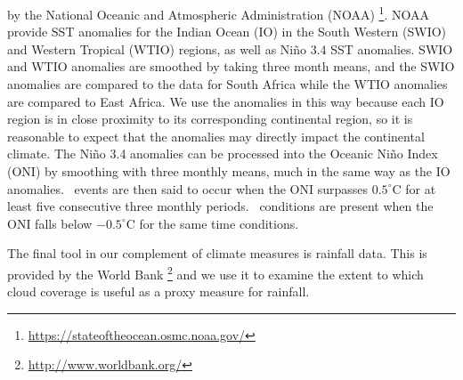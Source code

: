 by the National Oceanic and Atmospheric Administration
(NOAA) \footnote{\url{https://stateoftheocean.osmc.noaa.gov/}}. NOAA
provide SST anomalies for the Indian Ocean (IO) in the South Western
(SWIO) and Western Tropical (WTIO) regions, as well as Ni{\~n}o 3.4
SST anomalies. SWIO and WTIO anomalies are smoothed by taking three
month means, and the SWIO anomalies are compared to the data for South
Africa while the WTIO anomalies are compared to East Africa. We use
the anomalies in this way because each IO region is in close proximity
to its corresponding continental region, so it is reasonable to expect
that the anomalies may directly impact the continental climate. The
Ni{\~n}o 3.4 anomalies can be processed into the Oceanic Ni{\~n}o
Index (ONI) by smoothing with three monthly means, much in the same
way as the IO anomalies. \elnino\ events are then said to occur when
the ONI surpasses $0.5^{\circ}$C for at least five consecutive three
monthly periods. \nina\
conditions are present when the ONI falls
below $-0.5^{\circ}$C for the same time conditions.

The final tool in our complement of climate measures is rainfall
data. This is provided by the World
Bank \footnote{\url{http://www.worldbank.org/}} and we use it to
examine the extent to which cloud coverage is useful as a proxy
measure for rainfall.
